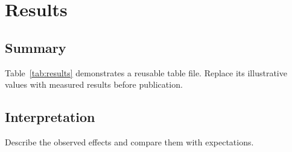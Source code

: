 \chapter{Results}
\label{ch:results}

\section{Summary}

Table~\ref{tab:results} demonstrates a reusable table file. Replace its
illustrative values with measured results before publication.



\section{Interpretation}

Describe the observed effects and compare them with expectations.

